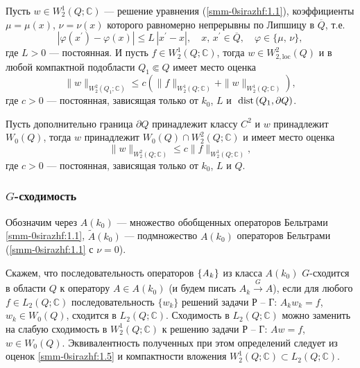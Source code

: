 \begin{theorem}\label{smm2-th2} Пусть $w\in W_2^1(Q;\mathbb{C})$ --- решение уравнения  {(\ref{smm-0sirazhf:1.1})}, коэффициенты $\mu=\mu(x)$, $\nu=\nu(x)$ которого равномерно непрерывны по Липшицу в $\overline Q$, т.е.
	$$
	|\varphi(x^\prime)-\varphi(x)|\leqslant L\,|x^\prime-x|,\quad x,\,x^\prime\in \overline{Q},\quad \varphi\in\{\mu,\,\nu\},
	$$
	где $L>0$ --- постоянная. И пусть  $f\in W_2^1(Q;\mathbb{C})$, тогда $w\in W_{2,\text{loc}}^2(Q)$ и в любой компактной подобласти $Q_1\Subset Q$ имеет место оценка
	\begin{equation}\label{smm-0sirazhf:1.6_1}
		\|w\|_{W^2_2(Q_1; \mathbb{C})}\leqslant c\left(\|f\|_{W^1_2(Q; \mathbb{C})}+\|w\|_{W^1_2(Q; \mathbb{C})}\right),
	\end{equation}
	где $c>0$ --- постоянная, зависящая только от $k_0$, $L$ и $\text{ dist\,}(Q_1,\partial Q)$.


Пусть дополнительно граница $\partial Q$ принадлежит классу $C^2$ и $w$ принадлежит $W_0(Q)$, тогда $w$ принадлежит $W_0(Q)\cap W_2^2(Q; \mathbb{C})$ и имеет место оценка
\begin{equation}\label{smm-0sirazhf:1.6_2}
	\|w\|_{W^2_2(Q; \mathbb{C})}\leqslant c\|f\|_{W^1_2(Q; \mathbb{C})},
\end{equation}
где $c>0$ --- постоянная, зависящая только от $k_0$, $L$ и $Q$.
\end{theorem}

\subsubsection{$G$-сходимость}
Обозначим через $A(k_0)$ --- множество обобщенных  операторов Бельтрами
\eqref{smm-0sirazhf:1.1}, $\tilde{A}(k_0)$ --- подмножество $A(k_0)$  операторов Бельтрами
(\eqref{smm-0sirazhf:1.1} с $\nu=0$).

\begin{definition}
Скажем, что последовательность операторов $\left\{ {\it A}_k\right\}$ из класса $A(k_0)$
$G$-сходится в области $Q$ к оператору $A\in A(k_0)$
(и будем писать $A_k\overset{G}{\longrightarrow} A$),
если для любого $f\in L_2(Q;\mathbb{C})$ последовательность $\{w_k\}$ решений задачи Р -- Г: $A_kw_k=f$, $w_k\in W_0(Q)$,
сходится в $L_2(Q;\mathbb{C})$. Сходимость в
$L_2(Q;\mathbb{C})$ можно заменить на слабую сходимость в
$W_2^1(Q;\mathbb{C})$ к решению задачи Р -- Г: $Aw=f$, $w\in W_0(Q)$. Эквивалентность полученных при этом определений следует из оценок \eqref{smm-0sirazhf:1.5} и компактности вложения
$W_2^1(Q;\mathbb{C})\subset L_2(Q;\mathbb{C})$.
\end{definition}

